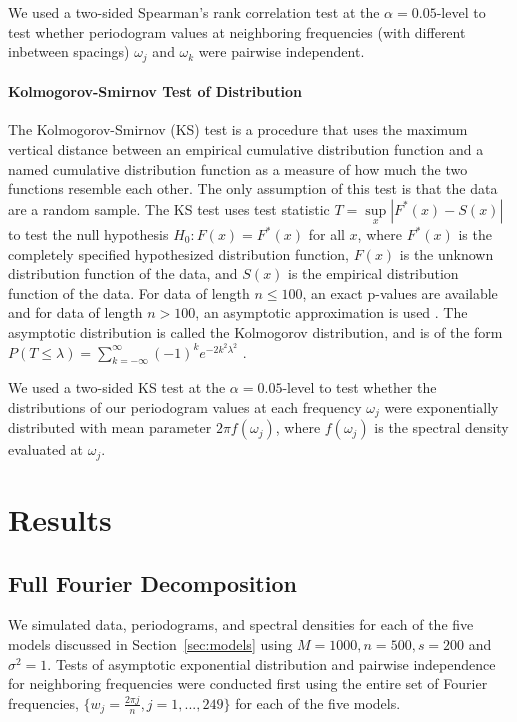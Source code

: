 \documentclass{article}\usepackage{graphicx, color}
\theoremstyle{plain}
\begin{document}
We used a two-sided Spearman's rank correlation test at the $\alpha = 0.05$-level to test whether periodogram values at neighboring frequencies (with different inbetween spacings) $\omega_j$ and $\omega_k$ were pairwise independent.


\paragraph{Kolmogorov-Smirnov Test of Distribution}
The Kolmogorov-Smirnov (KS) test is a procedure that uses the maximum vertical distance between an empirical cumulative distribution function and a named cumulative distribution function as a measure of how much the two functions resemble each other. The only assumption of this test is that the data are a random sample. The KS test uses test statistic $T = \sup\limits_x |F^*(x) - S(x)|$ to test the null hypothesis $H_0: F(x) = F^*(x)$ for all $x$, where $F^*(x)$ is the completely specified hypothesized distribution function, $F(x)$ is the unknown distribution function of the data, and $S(x)$ is the empirical distribution function of the data. For data of length $n \le 100$, an exact p-values are available and for data of length $n > 100$, an asymptotic approximation is used \cite{conover1998practical}. The asymptotic distribution is called the Kolmogorov distribution, and is of the form $P(T \le \lambda) = \sum_{k=-\infty}^\infty (-1)^k e^{-2k^2 \lambda^2}$ \cite{kolmogorov1992empirical}.

We used a two-sided KS test at the $\alpha = 0.05$-level to test whether the distributions of our periodogram values at each frequency $\omega_j$ were exponentially distributed with mean parameter $2\pi f(\omega_j)$, where $f(\omega_j)$ is the spectral density evaluated at $\omega_j$.




\section{Results}




\subsection{Full Fourier Decomposition}

We simulated data, periodograms, and spectral densities for each of the five models discussed in Section~\ref{sec:models} using $M=1000, n=500, s=200$ and $\sigma^2=1$. Tests of asymptotic exponential distribution and pairwise independence for neighboring frequencies were conducted first using the entire set of Fourier frequencies, $\{w_j = \frac{2\pi j}{n}, j=1,...,249\}$ for each of the five models.
\end{document}
